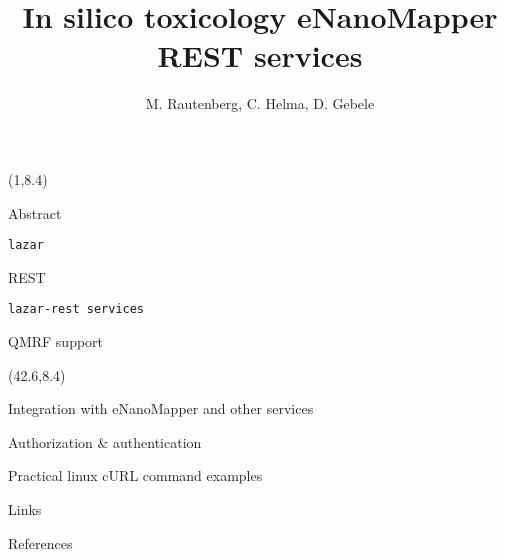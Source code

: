 \documentclass[final]{beamer}
\title{In silico toxicology eNanoMapper REST services}
\author{M. Rautenberg, C. Helma, D. Gebele}
\institute{\emph{in silico} toxicology gmbh, Basel, Switzerland}
\begin{document}
  \begin{frame}{}

    \begin{textblock}{40.5}(1,8.4)
      \begin{block}{Abstract}
        \justifying
        
      \end{block}

      \begin{block}{\tt{lazar}}
        \justifying
        
      \end{block}

      \begin{block}{REST}
        \justifying
        
      \end{block}

      \begin{block}{\tt{lazar-rest} services}
        \justifying
        
      \end{block}


      \begin{block}{QMRF support}
        \justifying
        
      \end{block}

    \end{textblock}

    \begin{textblock}{40.5}(42.6,8.4)

      \begin{block}{Integration with eNanoMapper and other services}
        
      \end{block}

      \begin{block}{Authorization \& authentication}
        \justifying        
        
      \end{block}

      \begin{alertblock}{Practical linux cURL command examples}
        
      \end{alertblock}

      \begin{exampleblock}{Links}
        
      \end{exampleblock}

      \begin{block}{References}
        \justifying
        \small
      \end{block}

    \end{textblock}

  \end{frame}
\end{document}
